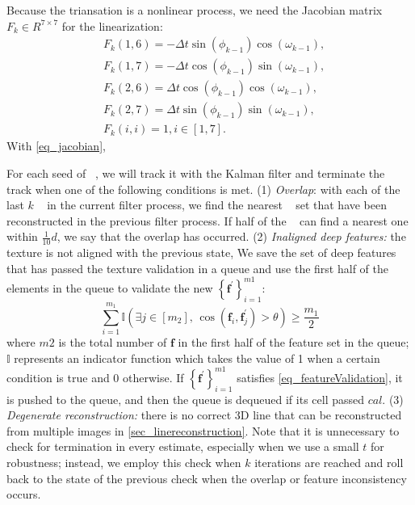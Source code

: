 Because the triansation is a nonlinear process,
we need the Jacobian matrix $F_k \in R^{7\times7}$ for the linearization:
\begin{equation}
    \begin{aligned}
        &F_k(1,6)=-\Delta t \sin(\phi_{k-1}) \cos(\omega_{k-1}),\\
        &F_k(1,7)=-\Delta t \cos(\phi_{k-1}) \sin(\omega_{k-1}),\\
        &F_k(2,6)=\Delta t \cos(\phi_{k-1}) \cos(\omega_{k-1}) ,\\
        &F_k\left(2,7\right)=\Delta t \sin(\phi_{k-1}) \sin(\omega_{k-1}),\\
        &F_k\left(i,i\right)=1,i \in [1,7].
    \end{aligned}
    \label {eq_jacobian}
\end{equation}
With \cref{eq_jacobian},

For each seed of \rlp~,
we will track it with the Kalman filter and terminate the track when one of the following conditions is met.
(1) \textit{Overlap}:
with each of the last $k$ \rlp~ in the current filter process, 
we find the nearest \rlp~ set that have been reconstructed in the previous filter process.
If half of the \rlp~ can find a nearest one within $\frac{1}{10}d$,
we say that the overlap has occurred.
(2) \textit{Inaligned deep features:}
the texture is not aligned with the previous state,
We save the set of deep features that has passed the texture validation in a queue and use the first half of the elements in the queue to validate the new $\left\{\mathbf f^\prime\right\}_{i=1}^{m1}$:
\begin{equation}
\sum_{i=1}^{m_1} \mathbb{I} \left( \exists j \in \left[ m_2 \right], \, \cos \left( \mathbf{f}_i, \mathbf f^{\prime}_j \right) > \theta \right) \geq \frac{m_1}{2}
\label{eq_featureValidation}
\end{equation}
where $m2$ is the total number of $\mathbf f$ in the first half of the feature set in the queue;
$\mathbb{I}$ represents an indicator function which takes the value of 1 when a certain condition is true and 0 otherwise.
If $\left\{\mathbf f^\prime\right\}_{i=1}^{m1}$ satisfies \cref{eq_featureValidation},
it is pushed to the queue, 
and then the queue is dequeued if its cell passed $cal$.
(3) \textit{Degenerate reconstruction:}
there is no correct 3D line that can be reconstructed from multiple images in \cref{sec_linereconstruction}.
Note that
it is unnecessary to check for termination in every estimate, especially when we use a small $t$ for robustness;
instead,
we employ this check when $k$ iterations are reached and roll back to the state of the previous check when the overlap or feature inconsistency occurs. 

